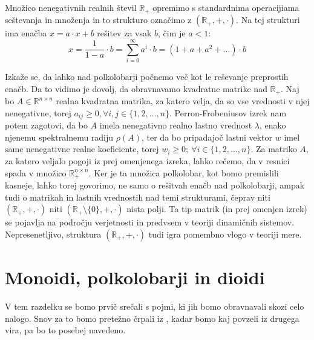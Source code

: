 \documentclass[mat1]{fmfdelo}
\newcommand{\R}{\mathbb{R}}
\newcommand{\Pplus}[1]{\mathbb{#1}_{+}}
\begin{document}
\begin{zgled}
	Množico nenegativnih realnih števil $\Pplus{R}$ opremimo s standardnima operacijiama seštevanja in množenja in to strukturo označimo z $(\Pplus{R}, +, \cdot)$. Na tej strukturi ima enačba $x = a\cdot x + b$ rešitev za vsak $b$, čim je $a < 1$: $$ x = \frac{1}{1 - a} \cdot b = \sum_{i = 0}^{\infty}a^i \cdot b = (1 + a + a^2 + \ldots)\cdot b$$
\end{zgled}

Izkaže se, da lahko nad polkolobarji počnemo več kot le reševanje preprostih enačb. Da to vidimo je dovolj, da obravnavamo kvadratne matrike nad $\Pplus{R}$. 
Naj bo $A \in\R^{n\times n}$ realna kvadratna matrika, za katero velja, da so vse vrednosti v njej nenegativne, torej $a_{ij} \geq 0, \forall i, j \in \{1, 2, \ldots, n\}$. Perron-Frobeniusov izrek nam potem zagotovi, da bo $A$ imela nenegativno realno lastno vrednost $\lambda$, enako njenemu spektralnemu radiju $\rho(A)$, ter da bo pripadajoč lastni vektor $w$ imel same nenegativne realne koeficiente, torej $w_i \geq 0;~\forall i\in \{1, 2, \ldots, n\}$. 
Za matriko $A$, za katero veljalo pogoji iz prej omenjenega izreka, lahko rečemo, da v resnici spada v množico $\Pplus{R}^{n\times n}$. Ker je ta množica polkolobar, kot bomo premislili kasneje, lahko torej govorimo, ne samo o rešitvah enačb nad polkolobarji, ampak tudi o matrikah in lastnih vrednostih nad temi strukturami, čeprav niti $(\Pplus{R}, +, \cdot)$ niti $(\Pplus{R}\setminus\{0\}, +, \cdot)$ nista polji. Ta tip matrik (in prej omenjen izrek) se pojavlja na področju verjetnosti in predvsem v teoriji dinamičnih sistemov. Nepresenetljivo, struktura $(\Pplus{R}, +, \cdot)$ tudi igra pomembno vlogo v teoriji mere.

\section{Monoidi, polkolobarji in dioidi}\label{sect:basicstructures}
V tem razdelku se bomo prvič srečali s pojmi, ki jih bomo obravnavali skozi celo nalogo. Snov za to bomo pretežno črpali iz \cite[poglavje 1]{bib:Gondran}, kadar bomo kaj povzeli iz drugega vira, pa bo to posebej navedeno. 
\end{document}
